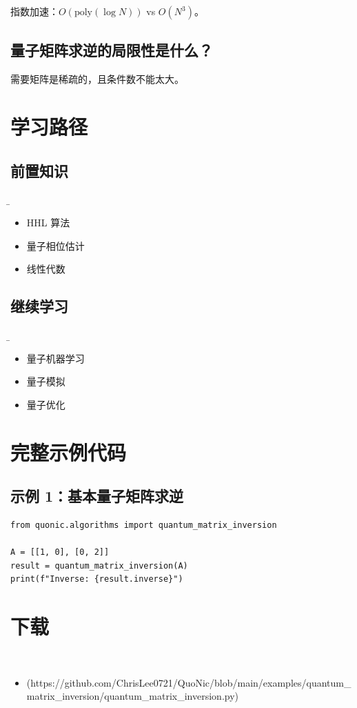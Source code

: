 \documentclass[12pt,a4paper]{article}
\begin{document}
指数加速：$O(\text{poly}(\log N))$ vs $O(N^3)$。

\subsection{量子矩阵求逆的局限性是什么？}

需要矩阵是稀疏的，且条件数不能太大。

\section{学习路径}

\subsection{前置知识}
\b\begin{itemize}
  \item HHL 算法
  \item 量子相位估计
  \item 线性代数
\end{itemize}

\subsection{继续学习}
\b\begin{itemize}
  \item 量子机器学习
  \item 量子模拟
  \item 量子优化
\end{itemize}

\section{完整示例代码}

\subsection{示例 1：基本量子矩阵求逆}

\begin{lstlisting}[style=python]
from quonic.algorithms import quantum_matrix_inversion

A = [[1, 0], [0, 2]]
result = quantum_matrix_inversion(A)
print(f"Inverse: {result.inverse}")
\end{lstlisting}


\section{下载}

\begin{itemize}
  \item [quantum_matrix_inversion.py](https://github.com/ChrisLee0721/QuoNic/blob/main/examples/quantum_matrix_inversion/quantum_matrix_inversion.py)
\end{itemize}
\end{document}
